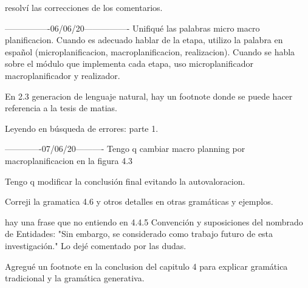 resolví las correcciones de los comentarios.

----------------06/06/20----------------
Unifiqué las palabras micro macro planificacion. Cuando es adecuado hablar de la etapa, utilizo la palabra en español (microplanificacion, macroplanificacion, realizacion). Cuando se habla sobre el módulo que implementa cada etapa, uso microplanificador macroplanificador y realizador.

En 2.3 generacion de lenguaje natural, hay un footnote donde se puede hacer referencia a la tesis de matias.

Leyendo en búsqueda de errores: parte 1.


-------------07/06/20----------
Tengo q cambiar macro planning por macroplanificacion en la figura 4.3

Tengo q modificar la conclusión final evitando la autovaloracion.

Correji la gramatica 4.6 y otros detalles en otras gramáticas y ejemplos.

hay una frase que no entiendo en 4.4.5 Convención y suposiciones del nombrado de Entidades: "Sin embargo, se considerado como trabajo futuro de esta investigación." Lo dejé comentado por las dudas.

Agregué un footnote en la conclusion del capitulo 4 para explicar gramática tradicional y la gramática generativa.